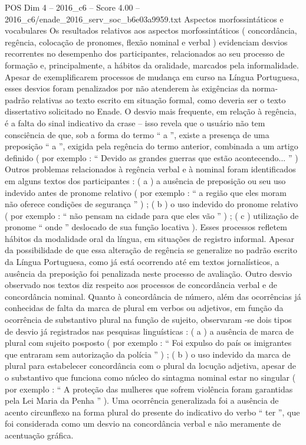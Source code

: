 \begin{textsample}{POS Dim 4 – 2016\_c6 – Score 4.00 – 2016\_c6/enade\_2016\_serv\_soc\_b6e03a9959.txt}
Aspectos morfossintáticos e vocabulares Os resultados relativos aos aspectos morfossintáticos ( concordância, regência, colocação de pronomes, flexão nominal e verbal ) evidenciam desvios recorrentes no desempenho dos participantes, relacionados ao seu processo de formação e, principalmente, a hábitos da oralidade, marcados pela informalidade.
Apesar de exemplificarem processos de mudança em curso na Língua Portuguesa, esses desvios foram penalizados por não atenderem às exigências da norma-padrão relativas ao texto escrito em situação formal, como deveria ser o texto dissertativo solicitado no Enade.
O desvio mais frequente, em relação à regência, é a falta do sinal indicativo da crase – isso revela que o usuário não tem consciência de que, sob a forma do termo “ a ”, existe a presença de uma preposição “ a ”, exigida pela regência do termo anterior, combinada a um artigo definido ( por exemplo : “ Devido as grandes guerras que estão acontecendo... ” ) Outros problemas relacionados à regência verbal e à nominal foram identificados em alguns textos dos participantes : ( a ) a ausência de preposição ou seu uso indevido antes de pronome relativo ( por exemplo : “ a região que eles moram não oferece condições de segurança ” ) ; ( b ) o uso indevido do pronome relativo ( por exemplo : “ não pensam na cidade para que eles vão ” ) ; ( c ) utilização de pronome “ onde ” deslocado de sua função locativa ).
Esses processos refletem hábitos da modalidade oral da língua, em situações de registro informal.
Apesar da possibilidade de que essa alteração de regência se generalize no padrão escrito da Língua Portuguesa, como já está ocorrendo até em textos jornalísticos, a ausência da preposição foi penalizada neste processo de avaliação.
Outro desvio observado nos textos diz respeito aos processos de concordância verbal e de concordância nominal.
Quanto à concordância de número, além das ocorrências já conhecidas de falta da marca de plural em verbos ou adjetivos, em função da ocorrência de substantivo plural na função de sujeito, observaram -se dois tipos de desvio já registrados nas pesquisas linguísticas : ( a ) a ausência de marca de plural com sujeito posposto ( por exemplo : “ Foi expulso do país os imigrantes que entraram sem autorização da polícia ” ) ; ( b ) o uso indevido da marca de plural para estabelecer concordância com o plural da locução adjetiva, apesar de o substantivo que funciona como núcleo do sintagma nominal estar no singular ( por exemplo : “ A proteção das mulheres que sofrem violência foram garantidas pela Lei Maria da Penha ” ).
Uma ocorrência generalizada foi a ausência de acento circunflexo na forma plural do presente do indicativo do verbo “ ter ”, que foi considerada como um desvio na concordância verbal e não meramente de acentuação gráfica.

\end{textsample}
